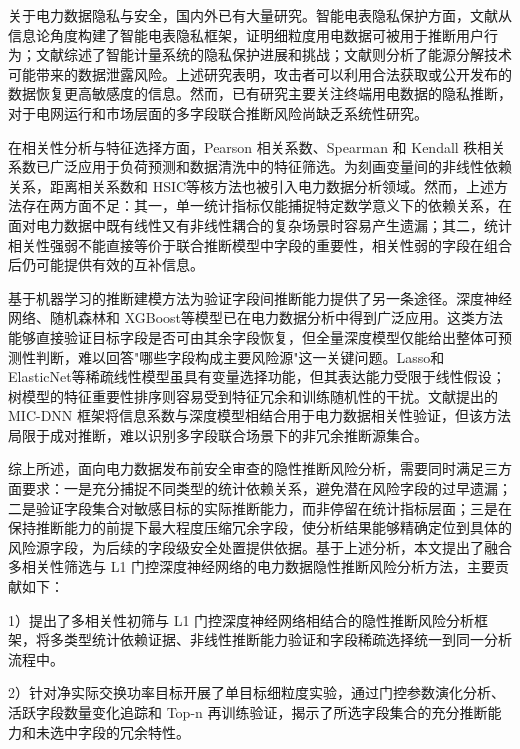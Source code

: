 \documentclass[UTF8,zihao=5,twoside]{ctexart}
\numberwithin{equation}{section}
\begin{document}
关于电力数据隐私与安全，国内外已有大量研究。智能电表隐私保护方面，文献\cite{ref-sankar}从信息论角度构建了智能电表隐私框架，证明细粒度用电数据可被用于推断用户行为；文献\cite{ref-giaconi}综述了智能计量系统的隐私保护进展和挑战；文献\cite{ref-adewole}则分析了能源分解技术可能带来的数据泄露风险。上述研究表明，攻击者可以利用合法获取或公开发布的数据恢复更高敏感度的信息。然而，已有研究主要关注终端用电数据的隐私推断，对于电网运行和市场层面的多字段联合推断风险尚缺乏系统性研究。

在相关性分析与特征选择方面，Pearson 相关系数、Spearman 和 Kendall 秩相关系数已广泛应用于负荷预测和数据清洗中的特征筛选\cite{ref-lan-load,ref-jiao-pv,ref-deng-load}。为刻画变量间的非线性依赖关系，距离相关系数\cite{ref-szekely-dcorr}和 HSIC\cite{ref-gretton-hsic}等核方法也被引入电力数据分析领域。然而，上述方法存在两方面不足：其一，单一统计指标仅能捕捉特定数学意义下的依赖关系，在面对电力数据中既有线性又有非线性耦合的复杂场景时容易产生遗漏；其二，统计相关性强弱不能直接等价于联合推断模型中字段的重要性，相关性弱的字段在组合后仍可能提供有效的互补信息。

基于机器学习的推断建模方法为验证字段间推断能力提供了另一条途径。深度神经网络、随机森林\cite{ref-breiman-rf}和 XGBoost\cite{ref-chen-xgboost}等模型已在电力数据分析中得到广泛应用\cite{ref-wang-meter}。这类方法能够直接验证目标字段是否可由其余字段恢复，但全量深度模型仅能给出整体可预测性判断，难以回答"哪些字段构成主要风险源"这一关键问题。Lasso\cite{ref-tibshirani-lasso}和 ElasticNet\cite{ref-zou-enet}等稀疏线性模型虽具有变量选择功能，但其表达能力受限于线性假设；树模型的特征重要性排序则容易受到特征冗余和训练随机性的干扰。文献\cite{ref-xing-micdnn}提出的 MIC-DNN 框架将信息系数与深度模型相结合用于电力数据相关性验证，但该方法局限于成对推断，难以识别多字段联合场景下的非冗余推断源集合。

综上所述，面向电力数据发布前安全审查的隐性推断风险分析，需要同时满足三方面要求：一是充分捕捉不同类型的统计依赖关系，避免潜在风险字段的过早遗漏；二是验证字段集合对敏感目标的实际推断能力，而非停留在统计指标层面；三是在保持推断能力的前提下最大程度压缩冗余字段，使分析结果能够精确定位到具体的风险源字段，为后续的字段级安全处置提供依据。基于上述分析，本文提出了融合多相关性筛选与 L1 门控深度神经网络的电力数据隐性推断风险分析方法，主要贡献如下：

1）提出了多相关性初筛与 L1 门控深度神经网络相结合的隐性推断风险分析框架，将多类型统计依赖证据、非线性推断能力验证和字段稀疏选择统一到同一分析流程中。

2）针对净实际交换功率目标开展了单目标细粒度实验，通过门控参数演化分析、活跃字段数量变化追踪和 Top-n 再训练验证，揭示了所选字段集合的充分推断能力和未选中字段的冗余特性。
\end{document}
